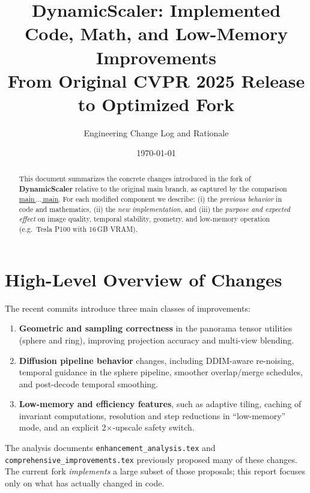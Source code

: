 \documentclass[11pt,a4paper]{article}
\title{
    \textbf{DynamicScaler: Implemented Code, Math, and Low-Memory Improvements} \\[4pt]
    \large From Original CVPR 2025 Release to Optimized Fork
}
\author{Engineering Change Log and Rationale}
\date{\today}
\newcommand{\file}[1]{\texttt{#1}}
\begin{document}
\maketitle

\begin{abstract}
This document summarizes the concrete changes introduced in the fork of \textbf{DynamicScaler} relative to the original main branch, as captured by the comparison
\href{https://github.com/sh-Lin/DynamicScaler/compare/main...AnshRaj112:DynamicScaler:main}{main\,$\dots$\,main}.
For each modified component we describe:
(i) the \emph{previous behavior} in code and mathematics,
(ii) the \emph{new implementation},
and (iii) the \emph{purpose and expected effect} on image quality, temporal stability, geometry, and low-memory operation (e.g.\ Tesla P100 with 16\,GB VRAM).
\end{abstract}

\tableofcontents
\newpage

\section{High-Level Overview of Changes}

The recent commits introduce three main classes of improvements:
\begin{enumerate}
    \item \textbf{Geometric and sampling correctness} in the panorama tensor utilities (sphere and ring), improving projection accuracy and multi-view blending.
    \item \textbf{Diffusion pipeline behavior} changes, including DDIM-aware re-noising, temporal guidance in the sphere pipeline, smoother overlap/merge schedules, and post-decode temporal smoothing.
    \item \textbf{Low-memory and efficiency features}, such as adaptive tiling, caching of invariant computations, resolution and step reductions in ``low-memory'' mode, and an explicit 2$\times$-upscale safety switch.
\end{enumerate}

The analysis documents \file{enhancement\_analysis.tex} and \file{comprehensive\_improvements.tex} previously proposed many of these changes.
The current fork \emph{implements} a large subset of those proposals; this report focuses only on what has actually changed in code.
\end{document}
